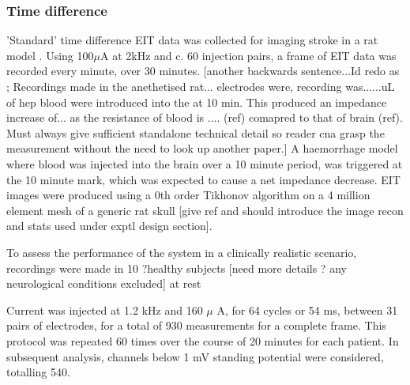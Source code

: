 \subsubsection{Time difference}
\label{methodsTD}
'Standard' time difference EIT data was collected for imaging stroke in a rat model \cite{Dowrick_2016}. Using 100\( \mu \)A at 2kHz and c. 60 injection pairs, a frame of EIT data was recorded every minute, over 30 minutes. [another backwards sentence...Id redo as ; Recordings made in the anethetised rat... electrodes were, recording was......uL of hep blood were introduced into the at 10 min. This produced an impedance increase of... as the resistance of blood is .... (ref) comapred to that of brain (ref). Must always give sufficient standalone technical detail so reader cna grasp the measurement without the need to look up another paper.] A haemorrhage model where blood was injected into the brain over a 10 minute period, was triggered at the 10 minute mark, which was expected to cause a net impedance decrease. EIT images were produced using a 0th order Tikhonov algorithm on a 4 million element mesh of a generic rat skull [give ref and should introduce the image recon and stats used under exptl design section].

To assess the performance of the system in a clinically realistic scenario, recordings were made in 10 ?healthy subjects [need more details ? any neurological conditions excluded] at rest 



Current was injected at 1.2 kHz and 160 $\mu$ A, for 64 cycles or 54 ms, between 31 pairs of electrodes, for a total of 930 measurements for a complete frame. This protocol was repeated 60 times over the course of 20 minutes for each patient. In subsequent analysis, channels below 1 mV standing potential were considered, totalling 540. 